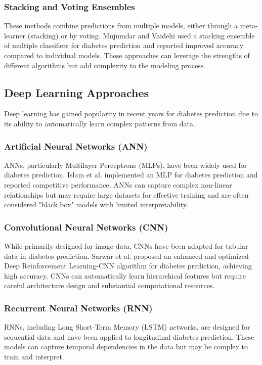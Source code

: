 \documentclass[journal]{IEEEtran}
\begin{document}
\subsubsection{Stacking and Voting Ensembles}
These methods combine predictions from multiple models, either through a meta-learner (stacking) or by voting. Mujumdar and Vaidehi \cite{mujumdar2019} used a stacking ensemble of multiple classifiers for diabetes prediction and reported improved accuracy compared to individual models. These approaches can leverage the strengths of different algorithms but add complexity to the modeling process.

\subsection{Deep Learning Approaches}
Deep learning has gained popularity in recent years for diabetes prediction due to its ability to automatically learn complex patterns from data.

\subsubsection{Artificial Neural Networks (ANN)}
ANNs, particularly Multilayer Perceptrons (MLPs), have been widely used for diabetes prediction. Islam et al. \cite{islam2018} implemented an MLP for diabetes prediction and reported competitive performance. ANNs can capture complex non-linear relationships but may require large datasets for effective training and are often considered "black box" models with limited interpretability.

\subsubsection{Convolutional Neural Networks (CNN)}
While primarily designed for image data, CNNs have been adapted for tabular data in diabetes prediction. Sarwar et al. \cite{sarwar2024} proposed an enhanced and optimized Deep Reinforcement Learning-CNN algorithm for diabetes prediction, achieving high accuracy. CNNs can automatically learn hierarchical features but require careful architecture design and substantial computational resources.

\subsubsection{Recurrent Neural Networks (RNN)}
RNNs, including Long Short-Term Memory (LSTM) networks, are designed for sequential data and have been applied to longitudinal diabetes prediction. These models can capture temporal dependencies in the data but may be complex to train and interpret.
\end{document}
